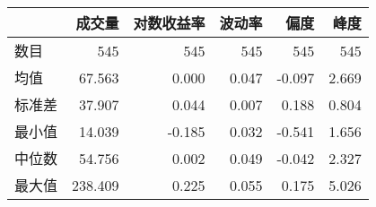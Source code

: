 \begin{tabular}{lrrrrr}
\toprule
{} &     成交量 &   对数收益率 &     波动率 &      偏度 &      峰度 \\
\midrule
数目  & 545 & 545 & 545 & 545 & 545 \\
均值  &  67.563 &  0.000 &   0.047 &  -0.097 &   2.669 \\
标准差 &  37.907 &   0.044 &   0.007 &   0.188 &   0.804 \\
最小值 &  14.039 &  -0.185 &   0.032 &  -0.541 &   1.656 \\
中位数 &  54.756 &   0.002 &   0.049 &  -0.042 &   2.327 \\
最大值 & 238.409 &   0.225 &   0.055 &   0.175 &   5.026 \\
\bottomrule
\end{tabular}
